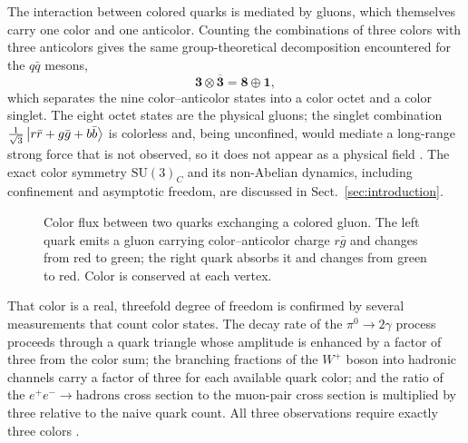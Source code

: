 The interaction between colored quarks is mediated by gluons, which themselves carry
one color and one anticolor. Counting the combinations of three colors with three
anticolors gives the same group-theoretical decomposition encountered for the
$q\bar q$ mesons,
\begin{equation}
    \mathbf{3} \otimes \overline{\mathbf{3}} = \mathbf{8} \oplus \mathbf{1},
\end{equation}
which separates the nine color--anticolor states into a color octet and a color
singlet. The eight octet states are the physical gluons; the singlet combination
$\tfrac{1}{\sqrt{3}}\ket{r\bar{r} + g\bar{g} + b\bar{b}}$ is colorless and, being
unconfined, would mediate a long-range strong force that is not observed, so it does
not appear as a physical field \cite[Ch.~10]{Amsler2018}. The exact color symmetry
$\mathrm{SU(3)}_{C}$ and its non-Abelian dynamics, including confinement and asymptotic
freedom, are discussed in Sect.~\ref{sec:introduction}.

\begin{figure}[htbp]
    \centering
    \caption{Color flux between two quarks exchanging a colored gluon. The
    left quark emits a gluon carrying color--anticolor charge $r\bar g$ and
    changes from red to green; the right quark absorbs it and changes from
    green to red. Color is conserved at each vertex.}
    \label{fig:color_flux}
\end{figure}

That color is a real, threefold degree of freedom is confirmed by several
measurements that count color states. The decay rate of the $\pi^0 \to 2\gamma$
process proceeds through a quark triangle whose amplitude is enhanced by a factor of
three from the color sum; the branching fractions of the $W^+$ boson into hadronic
channels carry a factor of three for each available quark color; and the ratio of
the $e^+e^- \to \mathrm{hadrons}$ cross section to the muon-pair cross section is
multiplied by three relative to the naive quark count. All three observations require
exactly three colors \cite[Ch.~10]{Amsler2018}.                         